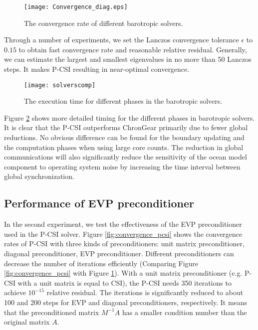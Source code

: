 \begin {figure}[!htbp]
\texttt{[image: Convergence\_diag.eps]}
\caption[] {The convergence rate of different barotropic solvers. \label{fig:convergence_diag}}
\end{figure}

Through a number of experiments, we set the Lanczos convergence tolerance $\epsilon$ to $0.15$ to obtain fast convergence rate and reasonable relative residual. Generally, we can estimate the largest and smallest eigenvalues in no more than 50  Lanczos steps. It makes P-CSI resulting in near-optimal convergence.

\begin {figure}[t!]
\texttt{[image: solverscomp]}
\caption[] {The execution time for different phases in the barotropic solvers. \label{fig:component1}}
\end {figure}

Figure \ref{fig:component1} shows more detailed timing for the different phases in barotropic solvers. It is clear that the P-CSI outperforms ChronGear primarily due to fewer global reductions.
No obvious difference can be found for the boundary updating and the computation phases when using large core counts.
The reduction in global communications will also significantly reduce the sensitivity of the ocean model component to operating system noise \citep{ferreira} by increasing the time interval between global synchronization.

\subsection{Performance of EVP preconditioner}\label{sec:exp-preconditioner}
In the second experiment, we test the effectiveness of the EVP preconditioner used in the P-CSI solver. Figure \ref{fig:convergence_pcsi} shows the convergence rates of P-CSI with three kinds of preconditioners: unit matrix preconditioner, diagonal preconditioner, EVP preconditioner.
Different preconditioners can decrease the number of iterations efficiently (Comparing Figure \ref{fig:convergence_pcsi} with Figure \ref{fig:convergence_diag}).
With a unit matrix preconditioner (e.g. P-CSI with a unit matrix is equal to CSI), the P-CSI needs 350 iterations to achieve $10^{-15}$ relative residual.
The iterations is  significantly reduced to about 100 and 200 steps for EVP and diagonal preconditioners, respectively.
It means that the preconditioned matrix $M^{-1}A$ has a smaller condition number than the original matrix $A$.

